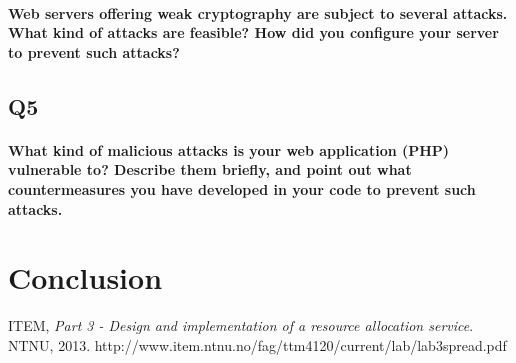 \documentclass[a4paper,11pt]{article}
\begin{document}
\paragraph{Web servers oﬀering weak cryptography are subject to several attacks. What kind of
attacks are feasible? How did you conﬁgure your server to prevent such attacks?}
\subsection{Q5}
\paragraph{What kind of malicious attacks is your web application (PHP) vulnerable to? Describe
them brieﬂy, and point out what countermeasures you have developed in your code to prevent
such attacks.}
\section*{Conclusion}
\begin{thebibliography}{9}
ITEM, 
	\emph{Part 3 - Design and implementation of a resource allocation service}.
	NTNU, 2013. http://www.item.ntnu.no/fag/ttm4120/current/lab/lab3spread.pdf
\end{thebibliography}
\listoffigures
\end{document}
